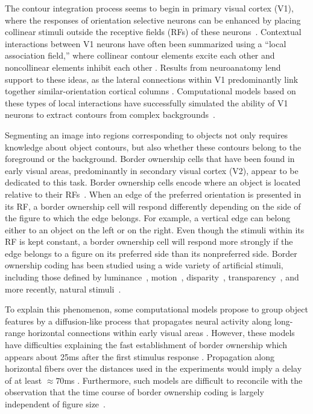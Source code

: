 The contour integration process seems to begin in primary visual cortex (V1), where the responses of orientation selective neurons can be enhanced by placing collinear stimuli outside the receptive fields (RFs) of these neurons~\citep{Stemmler_etal95a,Polat_etal98}. Contextual interactions between V1 neurons have often been summarized using a ``local association field,'' where collinear contour elements excite each other and noncollinear elements inhibit each other \citep{Ullman92, Field_etal93}. Results from neuroanatomy lend support to these ideas, as the lateral connections within V1 predominantly link together similar-orientation cortical columns \citep{Gilbert_Wiesel89,Bosking_etal97,
  Stettler_etal02}. Computational models based on these types of
local interactions have successfully simulated the ability of V1
neurons to extract contours from complex backgrounds~\citep{Li98,Yen_Finkel98,Piech_etal13}. 

Segmenting an image into regions corresponding to objects not only requires knowledge about object contours, but also whether these contours belong to the foreground or the background. Border ownership cells that have been found in early visual areas, predominantly in secondary visual cortex (V2), appear to be dedicated to this task. Border ownership cells encode where an object is located relative to their RFs~\citep{Zhou_etal00}. When an edge of the preferred orientation is presented in its RF, a border ownership cell will respond differently depending on the side of the figure to which the edge belongs. For example, a vertical edge can belong either to an object on the left or on the right. Even though the stimuli within its RF is kept constant, a border ownership cell will respond more strongly if the edge belongs to a figure on its preferred side than its nonpreferred side. Border ownership coding has been studied using a wide variety of artificial stimuli, including those defined by luminance~\citep{Zhou_etal00}, motion~\citep{vonderHeydt_etal03a}, disparity~\citep{Qiu_vonderHeydt05}, transparency~\citep{Qiu_vonderHeydt07}, and more recently, natural stimuli~\citep{Williford_vonderHeydt14}.

To explain this phenomenon, some computational models propose to group object features by a diffusion-like process that propagates neural activity along long-range horizontal connections within early visual areas \citep{Grossberg94, Sajda_Finkel95, Zhaoping05}. However, these models have difficulties explaining the fast establishment of border ownership which appears about 25ms after the first stimulus response \citep{Zhou_etal00}. Propagation along horizontal fibers over the distances used in the experiments would imply a delay of at least $\approx 70$ms \citep[][calculations based on the conduction velocity of horizontal fibers in primate V1 cortex, we are not aware of corresponding data for V2]{Girard_etal01}. Furthermore, such models are difficult to reconcile with the observation that the time course of border ownership coding is largely independent of figure size~\citep{Sugihara_etal11}.

